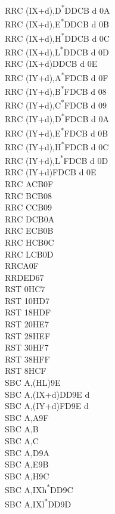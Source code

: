 \documentclass[oneside,a4paper]{book}
\begin{document}
\begin{multicols}{3}
{\begin{tabbing}
RRC (IX+d),D\textsuperscript{*}\>DDCB d 0A\\
RRC (IX+d),E\textsuperscript{*}\>DDCB d 0B\\
RRC (IX+d),H\textsuperscript{*}\>DDCB d 0C\\
RRC (IX+d),L\textsuperscript{*}\>DDCB d 0D\\
RRC (IX+d)\>DDCB d 0E\\
RRC (IY+d),A\textsuperscript{*}\>FDCB d 0F\\
RRC (IY+d),B\textsuperscript{*}\>FDCB d 08\\
RRC (IY+d),C\textsuperscript{*}\>FDCB d 09\\
RRC (IY+d),D\textsuperscript{*}\>FDCB d 0A\\
RRC (IY+d),E\textsuperscript{*}\>FDCB d 0B\\
RRC (IY+d),H\textsuperscript{*}\>FDCB d 0C\\
RRC (IY+d),L\textsuperscript{*}\>FDCB d 0D\\
RRC (IY+d)\>FDCB d 0E\\
RRC A\>CB0F\\
RRC B\>CB08\\
RRC C\>CB09\\
RRC D\>CB0A\\
RRC E\>CB0B\\
RRC H\>CB0C\\
RRC L\>CB0D\\
RRCA\>0F\\
RRD\>ED67\\
RST 0H\>C7\\
RST 10H\>D7\\
RST 18H\>DF\\
RST 20H\>E7\\
RST 28H\>EF\\
RST 30H\>F7\\
RST 38H\>FF\\
RST 8H\>CF\\
SBC A,(HL)\>9E\\
SBC A,(IX+d)\>DD9E d\\
SBC A,(IY+d)\>FD9E d\\
SBC A,A\>9F\\
SBC A,B\\
SBC A,C\\
SBC A,D\>9A\\
SBC A,E\>9B\\
SBC A,H\>9C\\
SBC A,IXh\textsuperscript{*}\>DD9C\\
SBC A,IXl\textsuperscript{*}\>DD9D\\

\end{tabbing}}
\end{multicols}
\end{document}
